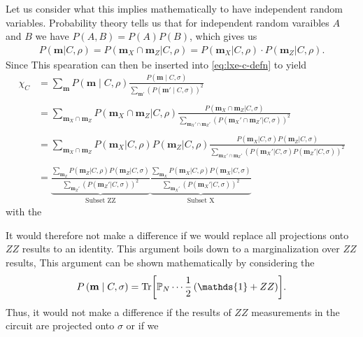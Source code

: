 Let us consider what this implies mathematically to have independent random
variables.
Probability theory tells us that for independent random varaibles $A$ and $B$
we have $P(A, B) = P(A)P(B)$, which gives us
\begin{align}
      P(\mathbf{m} | C, \rho) = P(\mathbf{m}_X \cap \mathbf{m}_Z | C, \rho) =
    P(\mathbf{m}_X | C, \rho)\cdot P(\mathbf{m}_Z | C, \rho)
.\end{align}
Since 
This spearation can then be inserted into \cref{eq:lxe-c-defn} to yield
\begin{align}
      \label{eq:lxe-subset}
      \chi_C &= \sum_{\mathbf{m}} P(\mathbf{m} \mid C, \rho) \frac{P(\mathbf{m} \mid
      C, \sigma)}{\sum_{\mathbf{m}'}\left(P(\mathbf{m}' \mid
      C, \sigma)\right)^2} \nonumber\\
      \nonumber\\
      &= \sum_{\mathbf{m}_X \cap \mathbf{m}_Z} P(\mathbf{m}_X \cap \mathbf{m}_Z |
        C, \rho) \frac{P(\mathbf{m}_X \cap \mathbf{m}_Z| C,
        \sigma)}{\sum_{\mathbf{m}_X' \cap \mathbf{m}_Z'} \left(P(\mathbf{m}_X' \cap
        \mathbf{m}_Z'|C,\sigma)\right)^2}\nonumber\\
        \nonumber\\
      &= \sum_{\mathbf{m}_X \cap \mathbf{m}_Z} P(\mathbf{m}_X | C, \rho) P(
        \mathbf{m}_Z | C, \rho) \frac{P(\mathbf{m}_X | C, \sigma) P( \mathbf{m}_Z|
        C, \sigma)}{\sum_{\mathbf{m}_X' \cap \mathbf{m}_Z'}
          \left(P(\mathbf{m}_X' | C,
        \sigma) P( \mathbf{m}_Z'|C,\sigma)\right)^2}\nonumber\\
        \nonumber\\
      &= \underbrace{\frac{\sum_{\mathbf{m}_Z} P(\mathbf{m}_Z | C, \rho)
          P(\mathbf{m}_Z | C, \sigma)}{\sum_{\mathbf{m}_Z'}
          \left(P(\mathbf{m}_Z' |
          C, \sigma)\right)^2}}_{\text{Subset ZZ}}
          \underbrace{\frac{\sum_{\mathbf{m}_X} P(\mathbf{m}_X | C, \rho)
          P(\mathbf{m}_X | C, \sigma)}{\sum_{\mathbf{m}_X'}
          \left(P(\mathbf{m}_X' |
          C, \sigma)\right)^2}}_{\text{Subset X}}
\end{align}
with the 

It would therefore not make a difference if we
would replace all projections onto $ZZ$ results to an identity. This argument
boils down to a marginalization over $ZZ$ results, 
This argument
can be shown mathematically by considering the 
\begin{align}
  P\left( \mathbf{m} \mid C, \sigma \right) = \Tr[\mathbb{P}_N \cdots
  \frac{1}{2} \left( \mathds{1} + ZZ \right) ]
.\end{align}
Thus, it would not make a difference if the
results of $ZZ$ measurements in the circuit are projected onto $\sigma$ or if
we 

